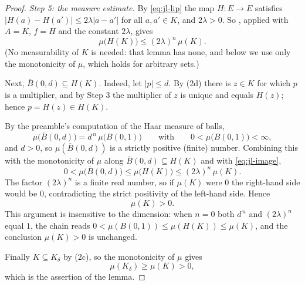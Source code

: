 \begin{proof}
\emph{Step 5: the measure estimate.}
By \eqref{eq:jl-lip} the map $H:E\to E$ satisfies
$|H(a)-H(a')|\le2\lambda|a-a'|$ for all $a,a'\in K$, and $2\lambda>0$. So
, applied with $A=K$, $f=H$ and the constant
$2\lambda$, gives
\begin{equation}\label{eq:jl-image}
  \mu\bigl(H(K)\bigr)\le(2\lambda)^{n}\,\mu(K).
\end{equation}
(No measurability of $K$ is needed: that lemma has none, and below we use only
the monotonicity of $\mu$, which holds for arbitrary sets.)

Next, $\overline B(0,d)\subseteq H(K)$. Indeed, let $|p|\le d$. By (2d) there is
$z\in K$ for which $p$ is a multiplier, and by Step 3 the multiplier of $z$ is
unique and equals $H(z)$; hence $p=H(z)\in H(K)$.

By the preamble's computation of the Haar measure of balls,
\[
  \mu\bigl(\overline B(0,d)\bigr)=d^{\,n}\,\mu\bigl(B(0,1)\bigr)
  \qquad\text{with}\qquad 0<\mu\bigl(B(0,1)\bigr)<\infty,
\]
and $d>0$, so $\mu(\overline B(0,d))$ is a strictly positive (finite) number.
Combining this with the monotonicity of $\mu$ along
$\overline B(0,d)\subseteq H(K)$ and with \eqref{eq:jl-image},
\[
  0<\mu\bigl(\overline B(0,d)\bigr)\le\mu\bigl(H(K)\bigr)
   \le(2\lambda)^{n}\,\mu(K).
\]
The factor $(2\lambda)^{n}$ is a finite real number, so if $\mu(K)$ were $0$ the
right-hand side would be $0$, contradicting the strict positivity of the
left-hand side. Hence
\[
  \mu(K)>0 .
\]
This argument is insensitive to the dimension: when $n=0$ both $d^{\,n}$ and
$(2\lambda)^{n}$ equal $1$, the chain reads
$0<\mu(B(0,1))\le\mu(H(K))\le\mu(K)$, and the conclusion $\mu(K)>0$ is
unchanged.

Finally $K\subseteq K_\delta$ by (2c), so the monotonicity of $\mu$ gives
\[
  \mu(K_\delta)\ge\mu(K)>0 ,
\]
which is the assertion of the lemma.
\end{proof}
